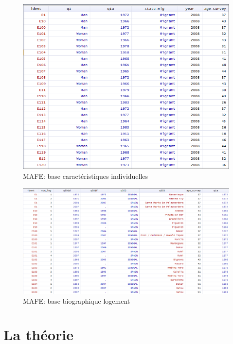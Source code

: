\documentclass[
  12pt,
  letterpaper,
  DIV=11,
  numbers=noendperiod,
  onepage,
  openany]{scrreprt}
\begin{document}
\begin{figure}

\caption{MAFE: base caractéristiques individuelles}

{\centering \includegraphics{images/Image3.png}

}

\end{figure}

\begin{figure}

\caption{MAFE: base biographique logement}

{\centering \includegraphics{images/Image4.png}

}

\end{figure}

\hypertarget{la-thuxe9orie}{%
\chapter{\texorpdfstring{\textbf{La
théorie}}{La théorie}}\label{la-thuxe9orie}}
\end{document}
